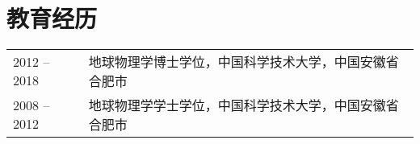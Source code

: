 \section*{教育经历}

\begin{tabular}{p{} p{}}
2012 -- 2018 & 地球物理学博士学位，中国科学技术大学，中国安徽省合肥市 \\
2008 -- 2012 & 地球物理学学士学位，中国科学技术大学，中国安徽省合肥市
\end{tabular}
